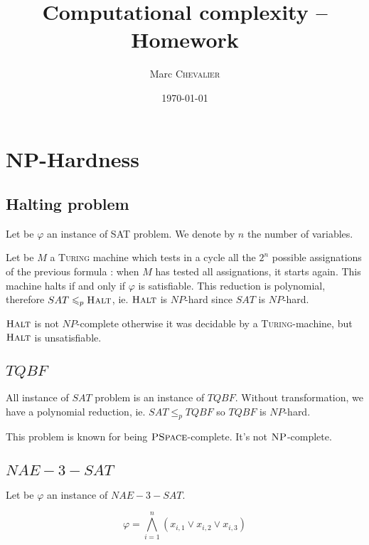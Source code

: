 

\author{
    Marc \textsc{Chevalier}
}
\date{\today}
\title{Computational complexity \--- Homework}



\maketitle

\section{NP-Hardness}
\subsection{Halting problem}

Let be $\varphi$ an instance of SAT problem. We denote by $n$ the number of variables.

Let be $M$ a \textsc{Turing} machine which tests in a cycle all the $2^n$ possible assignations of the previous formula : when $M$ has tested all assignations, it starts again. This machine halts if and only if $\varphi$ is satisfiable. This reduction is polynomial, therefore $SAT \leqslant_p \textsc{Halt}$, ie. $\textsc{Halt}$ is $NP$-hard since $SAT$ is $NP$-hard.

$\textsc{Halt}$ is not $NP$-complete otherwise it was decidable by a \textsc{Turing}-machine, but $\textsc{Halt}$ is unsatisfiable.

\subsection{\texorpdfstring{$TQBF$}{TQBF}}

All instance of $SAT$ problem is an instance of $TQBF$. Without transformation, we have a polynomial reduction, ie. $SAT\leqslant_p TQBF$ so $TQBF$ is $NP$-hard.

This problem is known for being $\textsc{PSpace}$-complete. It's not $\textsc{NP}$-complete.
   
\subsection{\texorpdfstring{$NAE-3-SAT$}{NAE-3-SAT}}

Let be $\varphi$ an instance of $NAE-3-SAT$.

$$
    \varphi = \bigwedge\limits_{i=1}^n \left(x_{i,1} \vee x_{i,2} \vee x_{i,3}\right)
$$

